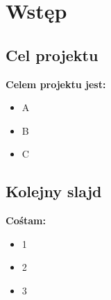 \section{Wstęp}

\subsection{Cel projektu}

\begin{frame}

\textbf{Celem projektu jest:}
\begin{itemize}
  \item A
  \item B
  \item C
\end{itemize}

\end{frame}


\subsection{Kolejny slajd}

\begin{frame}

\textbf{Cośtam:}

\begin{itemize}
  \item 1
  \item 2
  \item 3
\end{itemize}

\end{frame}
